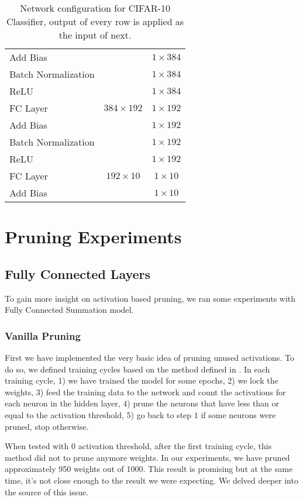 \begin{table}
\begin{tabular}{l | c | c}
Add Bias & & $ 1 \times 384$ \\
Batch Normalization & & $ 1 \times 384$ \\
ReLU & & $ 1 \times 384$ \\
\hline
FC Layer &  $384 \times 192 $ & $1 \times 192$ \\
Add Bias & & $ 1 \times 192$ \\
Batch Normalization & & $ 1 \times 192$ \\
ReLU & & $ 1 \times 192$ \\
\hline
FC Layer & $192 \times 10$  & $1 \times 10$ \\
Add Bias & & $1 \times 10$ 
\end{tabular}
\caption{Network configuration for CIFAR-10 Classifier, output of every row is applied as the input of next.}
\label{tab:baseline-cifar10-classifier}
\end{table}


\section{Pruning Experiments}
\subsection{Fully Connected Layers}
To gain more insight on activation based pruning, we ran some experiments with Fully Connected Summation model. 
\subsubsection{Vanilla Pruning}
First we have implemented the very basic idea of pruning unused activations. To do so, we defined training cycles based on the method defined in \cite{Hu:2016aa}. In each training cycle, 1) we have trained the model for some epochs, 2) we lock the weights, 3) feed the training data to the network and count the activations for each neuron in the hidden layer, 4) prune the neurons that have less than or equal to the activation threshold, 5) go back to step $1$ if some neurons were pruned, stop otherwise.

When tested with $0$ activation threshold, after the first training cycle, this method did not to prune anymore weights. In our experiments, we have pruned approximately 950 weights out of 1000. This result is promising but at the same time, it's not close enough to the result we were expecting. We delved deeper into the source of this issue.


